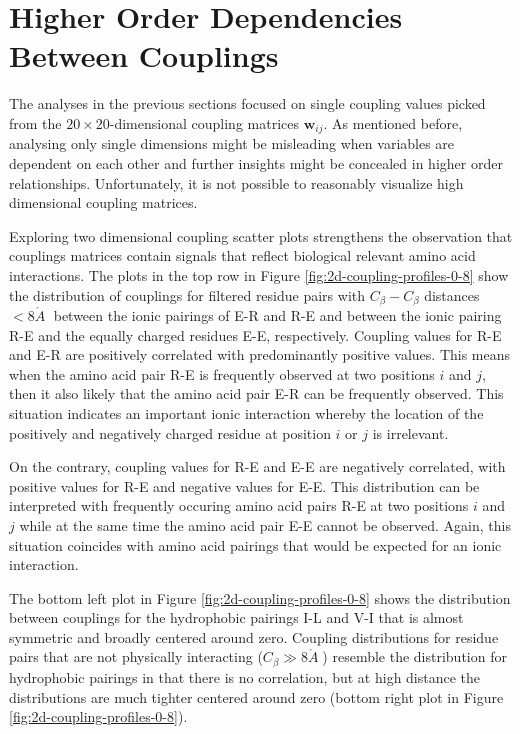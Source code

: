 \documentclass[11pt,a4paper,twoside]{book}
\newcommand{\Cb}{C_\beta}
\newcommand{\wij}{\mathbf{w}_{ij}}
\newcommand{\angstrom}{\mathring{A} \;}
\theoremstyle{definition}
\theoremstyle{definition}
\theoremstyle{remark}
\begin{document}
\section{Higher Order Dependencies Between
Couplings}\label{higher-order-coupling-profiles}

The analyses in the previous sections focused on single coupling values
picked from the \(20 \times 20\)-dimensional coupling matrices \(\wij\).
As mentioned before, analysing only single dimensions might be
misleading when variables are dependent on each other and further
insights might be concealed in higher order relationships.
Unfortunately, it is not possible to reasonably visualize high
dimensional coupling matrices.

Exploring two dimensional coupling scatter plots strengthens the
observation that couplings matrices contain signals that reflect
biological relevant amino acid interactions. The plots in the top row in
Figure \ref{fig:2d-coupling-profiles-0-8} show the distribution of
couplings for filtered residue pairs with \(\Cb-\Cb\) distances
\(< 8\angstrom\) between the ionic pairings of E-R and R-E and between
the ionic pairing R-E and the equally charged residues E-E,
respectively. Coupling values for R-E and E-R are positively correlated
with predominantly positive values. This means when the amino acid pair
R-E is frequently observed at two positions \(i\) and \(j\), then it
also likely that the amino acid pair E-R can be frequently observed.
This situation indicates an important ionic interaction whereby the
location of the positively and negatively charged residue at position
\(i\) or \(j\) is irrelevant.

On the contrary, coupling values for R-E and E-E are negatively
correlated, with positive values for R-E and negative values for E-E.
This distribution can be interpreted with frequently occuring amino acid
pairs R-E at two positions \(i\) and \(j\) while at the same time the
amino acid pair E-E cannot be observed. Again, this situation coincides
with amino acid pairings that would be expected for an ionic
interaction.

The bottom left plot in Figure \ref{fig:2d-coupling-profiles-0-8} shows
the distribution between couplings for the hydrophobic pairings I-L and
V-I that is almost symmetric and broadly centered around zero. Coupling
distributions for residue pairs that are not physically interacting
(\(\Cb \gg 8 \angstrom\)) resemble the distribution for hydrophobic
pairings in that there is no correlation, but at high distance the
distributions are much tighter centered around zero (bottom right plot
in Figure \ref{fig:2d-coupling-profiles-0-8}).
\end{document}
